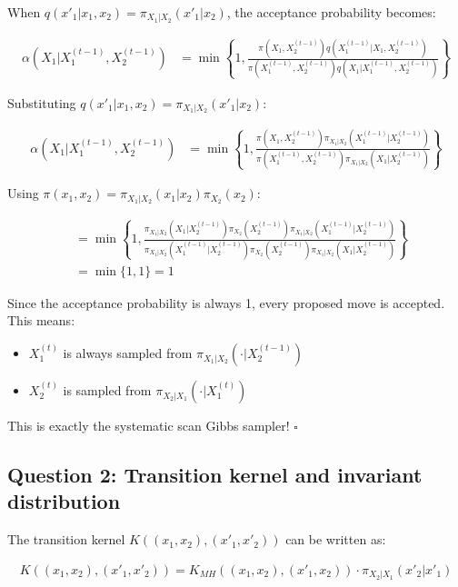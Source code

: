 When $q(x'_1|x_1, x_2) = \pi_{X_1|X_2}(x'_1|x_2)$, the acceptance probability becomes:

\begin{align*}
\alpha(X_1|X_1^{(t-1)}, X_2^{(t-1)}) &= \min\left\{1, \frac{\pi(X_1, X_2^{(t-1)})q(X_1^{(t-1)}|X_1, X_2^{(t-1)})}{\pi(X_1^{(t-1)}, X_2^{(t-1)})q(X_1|X_1^{(t-1)}, X_2^{(t-1)})}\right\}
\end{align*}

Substituting $q(x'_1|x_1, x_2) = \pi_{X_1|X_2}(x'_1|x_2)$:

\begin{align*}
\alpha(X_1|X_1^{(t-1)}, X_2^{(t-1)}) &= \min\left\{1, \frac{\pi(X_1, X_2^{(t-1)})\pi_{X_1|X_2}(X_1^{(t-1)}|X_2^{(t-1)})}{\pi(X_1^{(t-1)}, X_2^{(t-1)})\pi_{X_1|X_2}(X_1|X_2^{(t-1)})}\right\}
\end{align*}

Using $\pi(x_1, x_2) = \pi_{X_1|X_2}(x_1|x_2)\pi_{X_2}(x_2)$:

\begin{align*}
&= \min\left\{1, \frac{\pi_{X_1|X_2}(X_1|X_2^{(t-1)})\pi_{X_2}(X_2^{(t-1)})\pi_{X_1|X_2}(X_1^{(t-1)}|X_2^{(t-1)})}{\pi_{X_1|X_2}(X_1^{(t-1)}|X_2^{(t-1)})\pi_{X_2}(X_2^{(t-1)})\pi_{X_1|X_2}(X_1|X_2^{(t-1)})}\right\}\\
&= \min\{1, 1\} = 1
\end{align*}

Since the acceptance probability is always 1, every proposed move is accepted. This means:
\begin{itemize}
\item $X_1^{(t)}$ is always sampled from $\pi_{X_1|X_2}(\cdot|X_2^{(t-1)})$
\item $X_2^{(t)}$ is sampled from $\pi_{X_2|X_1}(\cdot|X_1^{(t)})$
\end{itemize}

This is exactly the systematic scan Gibbs sampler! $\square$

\subsection*{Question 2: Transition kernel and invariant distribution}

The transition kernel $K((x_1, x_2), (x'_1, x'_2))$ can be written as:

\begin{align*}
K((x_1, x_2), (x'_1, x'_2)) = K_{MH}((x_1, x_2), (x'_1, x_2)) \cdot \pi_{X_2|X_1}(x'_2|x'_1)
\end{align*}

